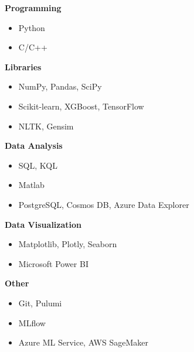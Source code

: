 
\vspace{0.35mm}

\textbf{Programming}\smallskip
\begin{itemize}
\item Python
\item C/C++
\end{itemize}
\vspace{3mm}

\textbf{Libraries}\smallskip
\begin{itemize}
\item NumPy, Pandas, SciPy
\item Scikit-learn, XGBoost, TensorFlow
\item NLTK, Gensim
\end{itemize}
\vspace{3mm}

\textbf{Data Analysis}\smallskip
\begin{itemize}
\item SQL, KQL
\item Matlab
\item PostgreSQL, Cosmos DB, Azure Data Explorer
\end{itemize}
\vspace{3mm}

\textbf{Data Visualization}\smallskip
\begin{itemize}
\item Matplotlib, Plotly, Seaborn
\item Microsoft Power BI
\end{itemize}
\vspace{3mm}

\textbf{Other}\smallskip
\begin{itemize}
\item Git, Pulumi
\item MLflow
\item Azure ML Service, AWS SageMaker
\end{itemize}



